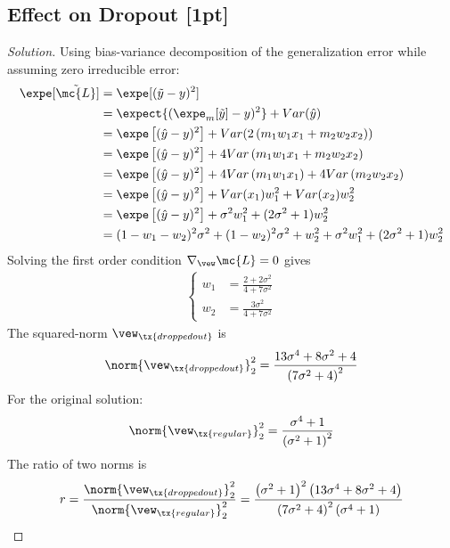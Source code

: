 \documentclass{article}
\begin{document}
	\subsection{Effect on Dropout [1pt]}
	\begin{proof}[Solution]
	Using bias-variance decomposition of the generalization error while assuming zero irreducible error:
		\begin{align}
			\expe[\tilde{\mc{L}}]
			&= \expe [(\tilde{y} - y)^2] \\
			&= \expect{(\expe_m[\tilde{y}] - y)^2}
			+ Var(\hat{y}) \\
			&= \expe \left[(
				\hat{y} - y
			)^2 \right]
			+ Var(2\left(m_{1} w_{1} x_{1}+m_{2} w_{2} x_{2}\right)) \\
			&= \expe \left[(
				\hat{y} - y
			)^2 \right]
			+ 4Var\left(m_{1} w_{1} x_{1}+m_{2} w_{2} x_{2}\right) \\
			&= \expe \left[(
				\hat{y} - y
			)^2 \right]
			+ 4Var\left(m_{1} w_{1} x_{1}\right)
			+ 4Var \left(m_{2} w_{2} x_{2}\right) \\
			&= \expe \left[(
				\hat{y} - y
			)^2 \right]
			+ Var(x_1) w_{1}^2
			+ Var(x_2) w_{2}^2 \\
			&= \expe \left[(
				\hat{y} - y
			)^2 \right]
			+ \sigma^2 w_{1}^2
			+ (2 \sigma^2 + 1) w_{2}^2 \\
			&= (1-w_1-w_2)^2 \sigma^2 + (1 - w_2)^2 \sigma^2 + w_2^2
			+ \sigma^2 w_{1}^2
			+ (2 \sigma^2 + 1) w_{2}^2
		\end{align}
		Solving the first order condition $\nabla_{\vew} \mc{L} = 0$ gives
		\begin{align}
			\begin{cases}
				w_1 &= \frac{2 + 2 \sigma^2}{4+7\sigma^2} \\
				w_2 &= \frac{3 \sigma^2}{4+7\sigma^2}
			\end{cases}
		\end{align}
		The squared-norm $\vew_\tx{dropped out}$ is
		\begin{align}
			\norm{\vew_\tx{dropped out}}_2^2 = \frac{13 \sigma ^4+8 \sigma ^2+4}{\left(7 \sigma ^2+4\right)^2}
		\end{align}
		For the original solution:
		\begin{align}
			\norm{\vew_\tx{regular}}_2^2 = \frac{\sigma ^4+1}{\left(\sigma ^2+1\right)^2}
		\end{align}
		The ratio of two norms is
		\begin{align}
			r = \frac{\norm{\vew_\tx{dropped out}}_2^2}{\norm{\vew_\tx{regular}}_2^2} = \frac{\left(\sigma ^2+1\right)^2 \left(13 \sigma ^4+8 \sigma ^2+4\right)}{\left(7 \sigma ^2+4\right)^2 \left(\sigma ^4+1\right)}

\end{align}
\end{proof}
\end{document}
